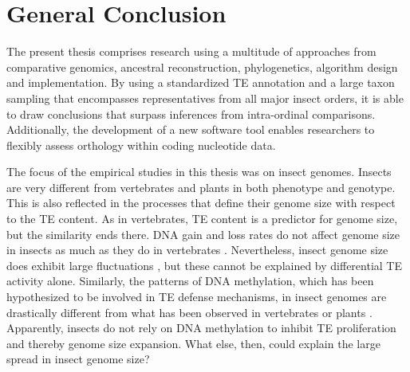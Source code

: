 \chapter{General Conclusion}
\label{conclusion}

The present thesis comprises research using a multitude of approaches
from comparative genomics, ancestral reconstruction, phylogenetics,
algorithm design and implementation. By using a standardized TE
annotation and a large taxon sampling that encompasses representatives
from all major insect orders, it is able to draw conclusions that
surpass inferences from intra-ordinal comparisons.  Additionally, the
development of a new software tool enables researchers to flexibly
assess orthology within coding nucleotide data.

The focus of the empirical studies in this thesis was on insect genomes.
Insects are very different from vertebrates and plants in both phenotype
and genotype. This is also reflected in the processes that define their
genome size with respect to the TE content. As in vertebrates, TE
content is a predictor for genome size, but the similarity ends there.
DNA gain and loss rates do not affect genome size in insects as much as
they do in vertebrates \citep{Kapusta2017-1} . Nevertheless, insect genome size does exhibit large
fluctuations \citep{Alfsnes2017}, but these cannot be explained by
differential TE activity alone. Similarly, the patterns of DNA
methylation, which has been hypothesized to be involved in TE defense
mechanisms, in insect genomes are drastically different from what has
been observed in vertebrates or plants \citep{Panagiotis2018} . Apparently, insects do not rely on DNA
methylation to inhibit TE proliferation and thereby genome size
expansion. What else, then, could explain the large spread in insect
genome size?


